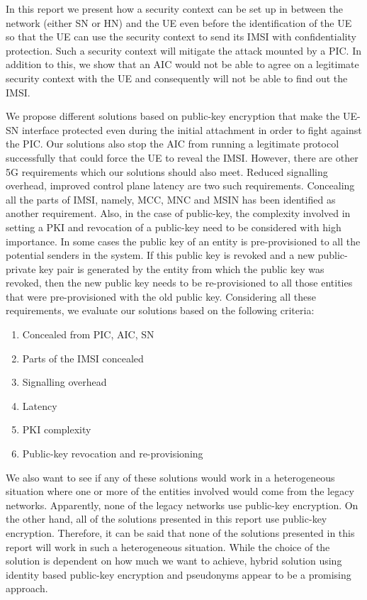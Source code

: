 \documentclass[12pt]{llncs}
\begin{document}
In this report we present how a security context can be set up in between the network (either SN or HN) and the UE even before the identification of the UE so that the UE can use the security context to send its IMSI with confidentiality protection. Such a security context will mitigate the attack mounted by a PIC. In addition to this, we show that an AIC would not be able to agree on a legitimate security context with the UE and consequently will not be able to find out the IMSI.

We propose different solutions based on public-key encryption that make the UE-SN interface protected even during the initial attachment in order to fight against the PIC. Our solutions also stop the AIC from running a legitimate protocol successfully that could force the UE to reveal the IMSI. However, there are other 5G requirements which our solutions should also meet. Reduced signalling overhead, improved control plane latency are two such requirements. Concealing all the parts of IMSI, namely, MCC, MNC and MSIN has been identified as another requirement. Also, in the case of public-key, the complexity involved in setting a PKI and revocation of a public-key need to be considered with high importance. In some cases the public key of an entity is pre-provisioned to all the potential senders in the system. If this public key is revoked and a new public-private key pair is generated by the entity from which the public key was revoked, then the new public key needs to be re-provisioned to all those entities that were pre-provisioned with the old public key. Considering all these requirements, we evaluate our solutions based on the following criteria:
\begin{enumerate}
\item Concealed from PIC, AIC, SN
\item Parts of the IMSI concealed
\item Signalling overhead
\item Latency
\item PKI complexity
\item Public-key revocation and re-provisioning 
\end{enumerate}

We also want to see if any of these solutions would work in a heterogeneous situation where one or more of the entities involved would come from the legacy networks. Apparently, none of the legacy networks use public-key encryption. On the other hand, all of the solutions presented in this report use public-key encryption. Therefore, it can be said that none of the solutions presented in this report will work in such a heterogeneous situation. While the choice of the solution is dependent on how much we want to achieve, hybrid solution using identity based public-key encryption and pseudonyms appear to be a promising approach.
\end{document}
